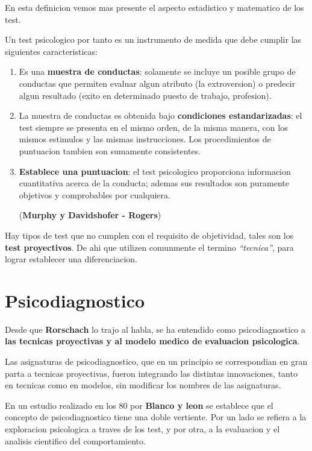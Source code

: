 \documentclass[12pt,a4paper]{article}
\begin{document}
En esta definicion vemos mas presente el aspecto estadistico y matematico de los test.

Un test psicologico por tanto es un instrumento de medida que debe cumplir las siguientes caracteristicas:

\begin{enumerate}
	\item Es una \textbf{muestra de conductas}: solamente se incluye un posible grupo de conductas que permiten evaluar algun atributo (la extroversion) o predecir algun resultado (exito en determinado puesto de trabajo, profesion). 
	
	\item La muestra de conductas es obtenida bajo \textbf{condiciones estandarizadas}: el test siempre se presenta en el mismo orden, de la misma manera, con los mismos estimulos y las mismas instrucciones. Los procedimientos de puntuacion tambien son sumamente consistentes. 

	\item \textbf{Establece una puntuacion}: el test psicologico proporciona informacion cuantitativa acerca de la conducta; ademas sus resultados son puramente objetivos y comprobables por cualquiera. 

	(\textbf{Murphy y Davidshofer - Rogers})
\end{enumerate}

Hay tipos de test que no cumplen con el requisito de objetividad, tales son los \textbf{test proyectivos}. De ahi que utilizen comunmente el termino \textit{\enquote{tecnica}}, para lograr establecer una diferenciacion. 

\section{Psicodiagnostico}

Desde que \textbf{Rorschach} lo trajo al habla, se ha entendido como psicodiagnostico a \textbf{las tecnicas proyectivas y al modelo medico de evaluacion psicologica}. 

Las asignaturas de psicodiagnostico, que en un principio se correspondian en gran parta a tecnicas proyectivas, fueron integrando las distintas innovaciones, tanto en tecnicas como en modelos, sin modificar los nombres de las asignaturas. 

En un estudio realizado en los 80 por \textbf{Blanco y leon} se establece que el concepto de psicodiagnostico tiene una doble vertiente. Por un lado se refiera a la exploracion psicologica a traves de los test, y por otra, a la evaluacion y el analisis cientifico del comportamiento. 
\end{document}
